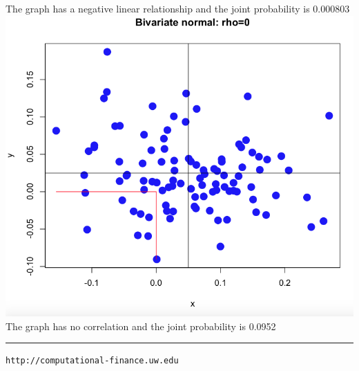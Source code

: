 \documentclass[letterpaper,12pt]{article}
\begin{document}
\begin{enumerate}
The graph has a negative linear relationship and the joint probability is 0.000803 \\ 
\includegraphics[scale = 0.5]{"No Association"} \\
The graph has no correlation and the joint probability is 0.0952
\end{enumerate}

\vfill \hrule \vspace{2mm} \centerline {\tt \tiny http://computational-finance.uw.edu}
\end{document}

